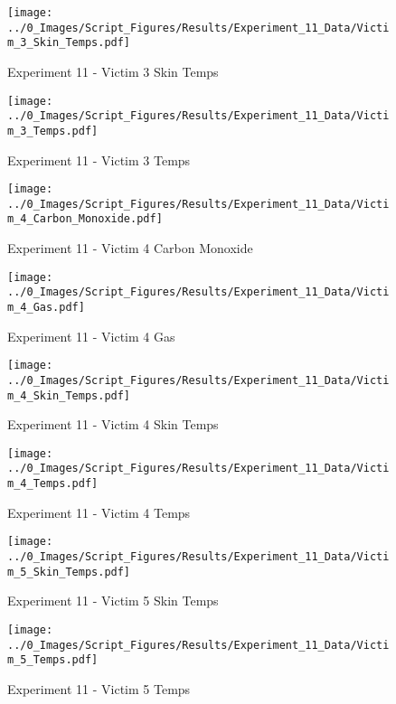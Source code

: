 	\begin{figure}[H]
		\centering
		\texttt{[image: ../0\_Images/Script\_Figures/Results/Experiment\_11\_Data/Victim\_3\_Skin\_Temps.pdf]}
		\caption[]{Experiment 11 - Victim 3 Skin Temps}
	\end{figure}
 
	\clearpage

	\begin{figure}[H]
		\centering
		\texttt{[image: ../0\_Images/Script\_Figures/Results/Experiment\_11\_Data/Victim\_3\_Temps.pdf]}
		\caption[]{Experiment 11 - Victim 3 Temps}
	\end{figure}
 

	\begin{figure}[H]
		\centering
		\texttt{[image: ../0\_Images/Script\_Figures/Results/Experiment\_11\_Data/Victim\_4\_Carbon\_Monoxide.pdf]}
		\caption[]{Experiment 11 - Victim 4 Carbon Monoxide}
	\end{figure}
 
	\clearpage

	\begin{figure}[H]
		\centering
		\texttt{[image: ../0\_Images/Script\_Figures/Results/Experiment\_11\_Data/Victim\_4\_Gas.pdf]}
		\caption[]{Experiment 11 - Victim 4 Gas}
	\end{figure}
 

	\begin{figure}[H]
		\centering
		\texttt{[image: ../0\_Images/Script\_Figures/Results/Experiment\_11\_Data/Victim\_4\_Skin\_Temps.pdf]}
		\caption[]{Experiment 11 - Victim 4 Skin Temps}
	\end{figure}
 
	\clearpage

	\begin{figure}[H]
		\centering
		\texttt{[image: ../0\_Images/Script\_Figures/Results/Experiment\_11\_Data/Victim\_4\_Temps.pdf]}
		\caption[]{Experiment 11 - Victim 4 Temps}
	\end{figure}
 

	\begin{figure}[H]
		\centering
		\texttt{[image: ../0\_Images/Script\_Figures/Results/Experiment\_11\_Data/Victim\_5\_Skin\_Temps.pdf]}
		\caption[]{Experiment 11 - Victim 5 Skin Temps}
	\end{figure}
 
	\clearpage

	\begin{figure}[H]
		\centering
		\texttt{[image: ../0\_Images/Script\_Figures/Results/Experiment\_11\_Data/Victim\_5\_Temps.pdf]}
		\caption[]{Experiment 11 - Victim 5 Temps}
	\end{figure}
 

